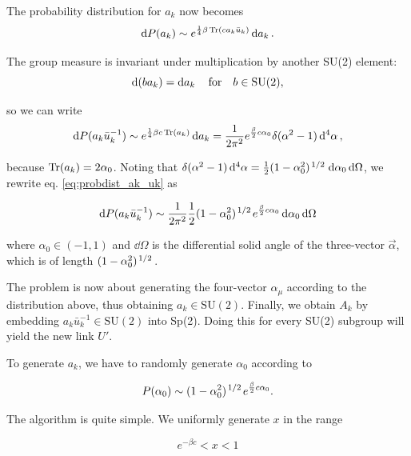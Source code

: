 \documentclass[reqno,12pt]{article}
\numberwithin{equation}{section}
\newcommand{\SU}{\mathrm{SU}}
\begin{document}
The probability distribution for $a_k$ now becomes
\begin{equation}
	\dd{P(a_k)} \sim e^{\frac{1}{4}\beta\Tr(c a_k \bar{u}_k)} \dd{a_k}.
\end{equation}

The group measure is invariant under multiplication by another SU(2) element:
\begin{equation}
	\dd(b a_k) = \dd{a_k} \qfor b \in \SU(2),
\end{equation}

so we can write
\begin{equation} \label{eq:probdist_ak_uk}
	\dd{P(a_k \bar{u}_k^{-1})} \sim e^{\frac{1}{4}\beta c \Tr(a_k)} \dd{a_k} 
	= \frac{1}{2\pi^2} e^{\frac{\beta}{2}c \alpha_0} \delta(\alpha^2 - 1) \dd[4]{\alpha},
\end{equation}

because $\Tr(a_k) = 2\alpha_0$. Noting that $\delta(\alpha^2 - 1)\dd[4]{\alpha} = 
\frac{1}{2}(1 - \alpha_0^2)^{\flatfrac{1}{2}} \dd{\alpha_0}\dd{\Omega}$, we rewrite eq. \eqref{eq:probdist_ak_uk} as

\begin{equation}
	\dd{P(a_k \bar{u}_k^{-1})} \sim 
	\frac{1}{2\pi^2} \frac{1}{2}(1 - \alpha_0^2)^{\flatfrac{1}{2}} e^{\frac{\beta}{2}c \alpha_0} \dd{\alpha_0}\dd{\Omega}
\end{equation}

where $\alpha_0 \in (-1,1)$ and $\dd{\Omega}$ is the differential solid angle of the three-vector $\vec{\alpha}$,
which is of length $(1 - \alpha_0^2)^{\flatfrac{1}{2}}$.

The problem is now about generating the four-vector $\alpha_\mu$ according to the distribution above, thus obtaining
$a_k \in \SU(2)$. Finally, we obtain $A_k$ by embedding $a_k \bar{u}_k^{-1} \in \SU(2)$ into Sp(2). Doing this for every 
SU(2) subgroup will yield the new link $U'$.

To generate $a_k$, we have to randomly generate $\alpha_0$ according to

\begin{equation} \label{eq:probdistalpha}
	P(\alpha_0) \sim (1 - \alpha_0^2)^{\flatfrac{1}{2}} e^{\frac{\beta}{2}c\alpha_0}.
\end{equation}

The algorithm is quite simple. We uniformly generate $x$ in the range 

\begin{equation}
	e^{-\beta c} < x < 1
\end{equation} 
\end{document}
